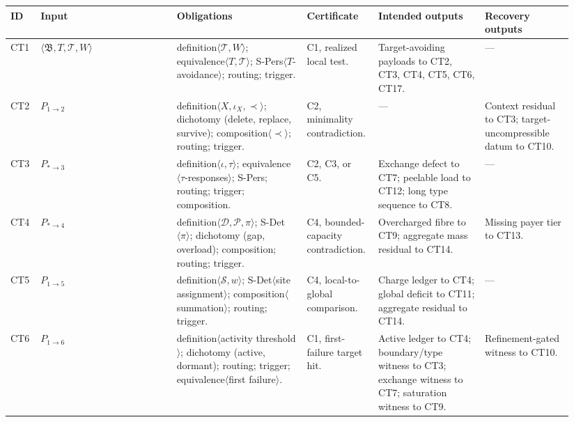 \documentclass[
  11pt,
]{article}
\theoremstyle{definition}
\begin{document}
\begingroup
\tiny
\setlength{\tabcolsep}{0.8pt}
\begin{longtable}[]{@{}
  >{\raggedright\arraybackslash}p{0.055\linewidth}
  >{\raggedright\arraybackslash}p{0.23\linewidth}
  >{\raggedright\arraybackslash}p{0.22\linewidth}
  >{\raggedright\arraybackslash}p{0.10\linewidth}
  >{\raggedright\arraybackslash}p{0.18\linewidth}
  >{\raggedright\arraybackslash}p{0.15\linewidth}@{}}
\toprule\noalign{}
ID & Input & Obligations & Certificate & Intended outputs & Recovery outputs \\
\midrule\noalign{}
\endhead
\bottomrule\noalign{}
\endlastfoot
CT1 & \(\langle\mathfrak B,T,\mathcal T,W\rangle\) & definition\(\langle\mathcal T,W\rangle\); equivalence\(\langle T,\mathcal T\rangle\); S-Pers\(\langle T\)-avoidance\(\rangle\); routing; trigger. & C1, realized local test. & Target-avoiding payloads to CT2, CT3, CT4, CT5, CT6, CT17. & --- \\
CT2 & \(P_{1\to2}\) & definition\(\langle X,\iota_X,\prec\rangle\); dichotomy (delete, replace, survive); composition\(\langle\prec\rangle\); routing; trigger. & C2, minimality contradiction. & --- & Context residual to CT3; target-uncompressible datum to CT10. \\
CT3 & \(P_{\ast\to3}\) & definition\(\langle\iota,\tau\rangle\); equivalence\(\langle\tau\)-responses\(\rangle\); S-Pers; routing; trigger; composition. & C2, C3, or C5. & Exchange defect to CT7; peelable load to CT12; long type sequence to CT8. & --- \\
CT4 & \(P_{\ast\to4}\) & definition\(\langle\mathcal D,\mathcal P,\pi\rangle\); S-Det\(\langle\pi\rangle\); dichotomy (gap, overload); composition; routing; trigger. & C4, bounded-capacity contradiction. & Overcharged fibre to CT9; aggregate mass residual to CT14. & Missing payer tier to CT13. \\
CT5 & \(P_{1\to5}\) & definition\(\langle\mathcal S,w\rangle\); S-Det\(\langle\)site assignment\(\rangle\); composition\(\langle\)summation\(\rangle\); routing; trigger. & C4, local-to-global comparison. & Charge ledger to CT4; global deficit to CT11; aggregate residual to CT14. & --- \\
CT6 & \(P_{1\to6}\) & definition\(\langle\)activity threshold\(\rangle\); dichotomy (active, dormant); routing; trigger; equivalence\(\langle\)first failure\(\rangle\). & C1, first-failure target hit. & Active ledger to CT4; boundary/type witness to CT3; exchange witness to CT7; saturation witness to CT9. & Refinement-gated witness to CT10. \\

\end{longtable}
\end{document}
